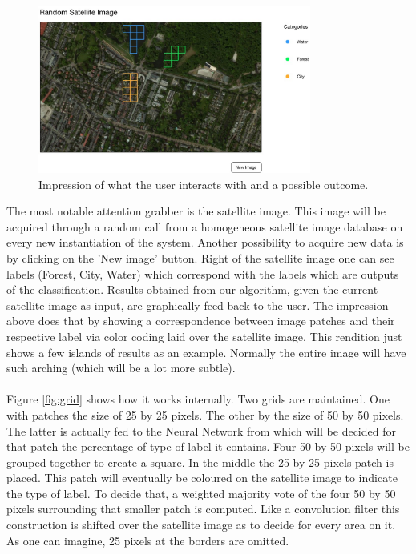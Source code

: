 \documentclass[a4paper,onecolumn]{report}
\begin{document}
\begin{figure}[h!]
    \centering
    \includegraphics[width=0.8\textwidth]{./images/impression.jpg}
    \caption{Impression of what the user interacts with and a possible outcome.}
	\label{fig:impression}
\end{figure}
\noindent
The most notable attention grabber is the satellite image. This image will be acquired through a random call from a homogeneous satellite image database on every new instantiation of the system. Another possibility to acquire new data is by clicking on the 'New image' button. Right of the satellite image one can see labels (Forest, City, Water) which correspond with the labels which are outputs of the classification. Results obtained from our algorithm, given the current satellite image as input, are graphically feed back to the user. The impression above does that by showing a correspondence between image patches and their respective label via color coding laid over the satellite image. This rendition just shows a few islands of results as an example. Normally the entire image will have such arching (which will be a lot more subtle).\\
\\
Figure \ref{fig:grid} shows how it works internally. Two grids are maintained. One with patches the size of 25 by 25 pixels. The other by the size of 50 by 50 pixels. The latter is actually fed to the Neural Network from which will be decided for that patch the percentage of type of label it contains.  Four 50 by 50 pixels will be grouped together to create a square. In the middle the 25 by 25 pixels patch is placed. This patch will eventually be coloured on the satellite image to indicate the type of label. To decide that, a weighted majority vote of the four 50 by 50 pixels surrounding that smaller patch is computed. Like a convolution filter this construction is shifted over the satellite image as to decide for every area on it. As one can imagine, 25 pixels at the borders are omitted. 
\end{document}
